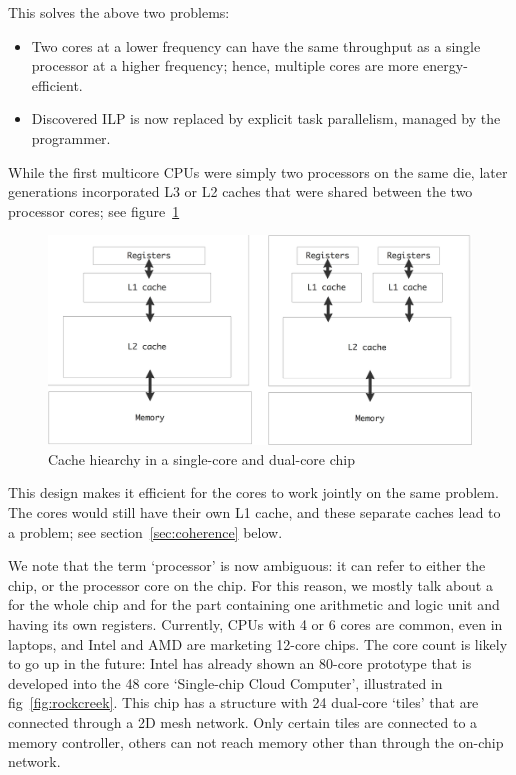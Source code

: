 This solves the above two problems:
\begin{itemize}
\item Two cores at a lower frequency can have the same throughput as a
  single processor at a higher frequency; hence, multiple cores are
  more energy-efficient.
\item Discovered \ac{ILP} is now replaced by explicit task
  parallelism, managed by the programmer.
\end{itemize}

While the first multicore CPUs
were simply two processors on the same die, later generations
incorporated L3 or L2 caches that were shared between the two
processor cores; see figure~\ref{fig:core-caches}
\begin{figure}[ht]
  \includegraphics[scale=.18]{graphics-public/cache-hierarchy}
  \caption{Cache hiearchy in a single-core and dual-core chip}
  \label{fig:core-caches}
\end{figure}
This design makes it efficient for the cores to work
jointly on the same problem. 
The cores would still have their own L1 cache, and these separate
caches lead to a  problem; see
section~\ref{sec:coherence} below.

We note that the term `processor' is now ambiguous: it can refer to either the
chip, or the processor core on the chip. For this reason, we mostly
talk about a  for the whole chip and
for the part containing one arithmetic and logic unit and
having its own registers. Currently, CPUs with 4 or 6 cores are
common,
even in laptops, and Intel and AMD are marketing 12-core chips.
The core count is
likely to go up in the future: Intel
has already shown an 80-core prototype that is developed into the 48
core `Single-chip Cloud Computer', illustrated in
fig~\ref{fig:rockcreek}. This chip has a structure with 24 dual-core
`tiles' that are connected through a 2D mesh network. Only certain
tiles are connected to a memory controller, others can not reach
memory other than through the on-chip network.

